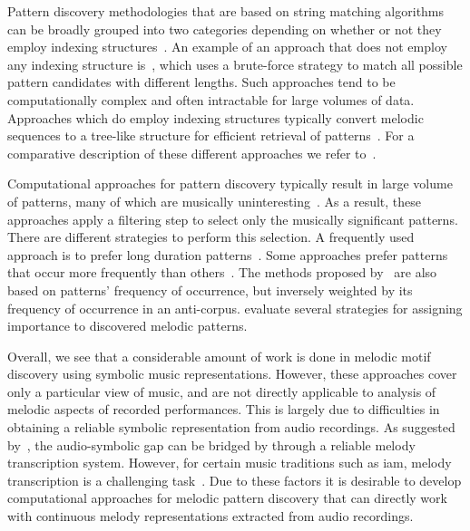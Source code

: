 Pattern discovery methodologies that are based on string matching algorithms can be broadly grouped into two categories depending on whether or not they employ indexing structures~\citep{Janssen2013}. An example of an approach that does not employ any indexing structure is~\cite{nieto2012perceptual}, which uses a brute-force strategy to match all possible pattern candidates with different lengths. Such approaches tend to be computationally complex and often intractable for large volumes of data. Approaches which do employ indexing structures typically convert melodic sequences to a tree-like structure for efficient retrieval of patterns~\citep{Knopke2009,conklin2011comparative}. For a comparative description of these different approaches we refer to~\cite{Janssen2013,meredith2002algorithms}.

Computational approaches for pattern discovery typically result in large volume of patterns, many of which are musically uninteresting~\citep{marsden2012counselling,conklin2010discovery}. As a result, these approaches apply a filtering step to select only the musically significant patterns. There are different strategies to perform this selection. A frequently used approach is to prefer long duration patterns~\citep{Cambouropoulos2006,Karydis2006}. Some approaches prefer patterns that occur more frequently than others~\citep{Cambouropoulos2006,meredith2002algorithms}. The methods proposed by~\cite{conklin2010discovery,conklin2011comparative} are also based on patterns' frequency of occurrence, but inversely weighted by its frequency of occurrence in an anti-corpus. \cite{collins2011modeling} evaluate several strategies for assigning importance to discovered melodic patterns.

Overall, we see that a considerable amount of work is done in melodic motif discovery using symbolic music representations. However, these approaches cover only a particular view of music, and are not directly applicable to analysis of melodic aspects of recorded performances. This is largely due to difficulties in obtaining a reliable symbolic representation from audio recordings. As suggested by~\cite{collins2014bridging}, the audio-symbolic gap can be bridged by through a reliable melody transcription system. However, for certain music traditions such as \gls{iam}, melody transcription is a challenging task~\citep{widdess1994involving}. Due to these factors it is desirable to develop computational approaches for melodic pattern discovery that can directly work with continuous melody representations extracted from audio recordings.



